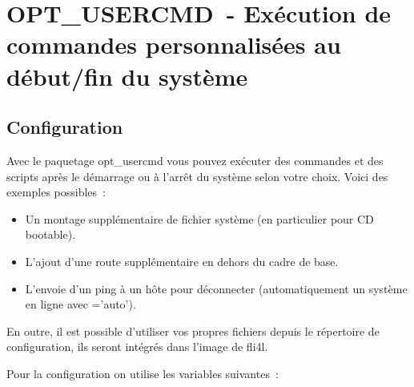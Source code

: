 
{
\section {OPT\_USERCMD~- Exécution de commandes personnalisées au début/fin du système}
}

\subsection{Configuration}

Avec le paquetage opt\_usercmd vous pouvez exécuter des commandes et des
scripts après le démarrage ou à l'arrêt du système selon votre choix.
Voici des exemples possibles~:

\begin{itemize}
    \item Un montage supplémentaire de fichier système (en particulier pour CD bootable).
    \item L'ajout d'une route supplémentaire en dehors du cadre de base.
    \item L'envoie d'un ping à un hôte pour déconnecter (automatiquement un système
      en ligne avec ='auto').
\end{itemize}

En outre, il est possible d'utiliser vos propres fichiers depuis le répertoire
de configuration, ils seront intégrés dans l'image de fli4l.

Pour la configuration on utilise les variables suivantes~:

